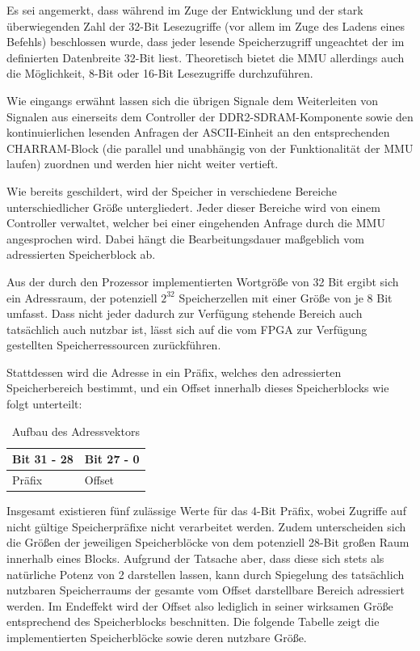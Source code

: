Es sei angemerkt, dass w\"ahrend im Zuge der Entwicklung und der stark \"uberwiegenden Zahl der 32-Bit Lesezugriffe (vor allem im Zuge des Ladens eines Befehls) beschlossen wurde, dass jeder lesende Speicherzugriff ungeachtet der im  definierten Datenbreite 32-Bit liest. Theoretisch bietet die MMU allerdings auch die M\"oglichkeit, 8-Bit oder 16-Bit Lesezugriffe durchzuf\"uhren.


Wie eingangs erw\"ahnt lassen sich die \"ubrigen Signale dem Weiterleiten von Signalen aus einerseits dem Controller der DDR2-SDRAM-Komponente sowie den kontinuierlichen lesenden Anfragen der ASCII-Einheit an den entsprechenden CHARRAM-Block (die parallel und unabh\"angig von der Funktionalit\"at der MMU laufen) zuordnen und werden hier nicht weiter vertieft.


Wie bereits geschildert, wird der Speicher in verschiedene Bereiche unterschiedlicher Gr\"o\ss{}e untergliedert. Jeder dieser Bereiche wird von einem Controller verwaltet, welcher bei einer eingehenden Anfrage durch die MMU angesprochen wird. Dabei h\"angt die Bearbeitungsdauer ma\ss{}geblich vom adressierten Speicherblock ab.

Aus der durch den Prozessor implementierten Wortgr\"o\ss{}e von 32 Bit ergibt sich ein Adressraum, der potenziell $2^{32}$ Speicherzellen mit einer Gr\"o\ss{}e von je 8 Bit umfasst. Dass nicht jeder dadurch zur Verf\"ugung stehende Bereich auch tats\"achlich auch nutzbar ist, l\"asst sich auf die vom FPGA zur Verf\"ugung gestellten Speicherressourcen zur\"uckf\"uhren.

Stattdessen wird die Adresse in ein Pr\"afix, welches den adressierten Speicherbereich bestimmt, und ein Offset innerhalb dieses Speicherblocks wie folgt unterteilt:

\begin{table}[H]
\begin{center}
	\begin{tabular}{| l | l |}
		\hline
		Bit 31 - 28 & Bit 27 - 0 \\ \hline
		Pr\"afix & Offset \\ \hline
	\end{tabular}
\end{center}
\caption{Aufbau des Adressvektors}
\end{table}

Insgesamt existieren f\"unf zul\"assige Werte f\"ur das 4-Bit Pr\"afix, wobei Zugriffe auf nicht g\"ultige Speicherpr\"afixe nicht verarbeitet werden. Zudem unterscheiden sich die Gr\"o\ss{}en der jeweiligen Speicherbl\"ocke von dem potenziell 28-Bit gro\ss{}en Raum innerhalb eines Blocks. Aufgrund der Tatsache aber, dass diese sich stets als nat\"urliche Potenz von 2 darstellen lassen, kann durch Spiegelung des tats\"achlich nutzbaren Speicherraums der gesamte vom Offset darstellbare Bereich adressiert werden. Im Endeffekt wird der Offset also lediglich in seiner wirksamen Gr\"o\ss{}e entsprechend des Speicherblocks beschnitten. Die folgende Tabelle zeigt die implementierten Speicherbl\"ocke sowie deren nutzbare Gr\"o\ss{}e.

